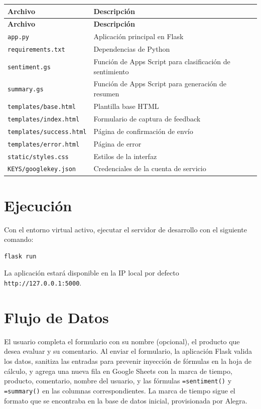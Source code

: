 \documentclass[12pt,a4paper]{article}
\begin{document}
\begin{longtable}{ll}
\textbf{Archivo} & \textbf{Descripción} \\
\midrule
\endfirsthead
\textbf{Archivo} & \textbf{Descripción} \\
\midrule
\endhead
\endlastfoot
\texttt{app.py} & Aplicación principal en Flask \\
\texttt{requirements.txt} & Dependencias de Python \\
\texttt{sentiment.gs} & Función de Apps Script para clasificación de sentimiento \\
\texttt{summary.gs} & Función de Apps Script para generación de resumen \\
\texttt{templates/base.html} & Plantilla base HTML \\
\texttt{templates/index.html} & Formulario de captura de feedback \\
\texttt{templates/success.html} & Página de confirmación de envío \\
\texttt{templates/error.html} & Página de error \\
\texttt{static/styles.css} & Estilos de la interfaz \\
\texttt{KEYS/googlekey.json} & Credenciales de la cuenta de servicio\\
\end{longtable}

\section{Ejecución}

Con el entorno virtual activo, ejecutar el servidor de desarrollo con el siguiente comando:

\begin{verbatim}
flask run
\end{verbatim}

La aplicación estará disponible en la IP local por defecto \texttt{http://127.0.0.1:5000}.

\section{Flujo de Datos}

El usuario completa el formulario con su nombre (opcional), el producto que desea evaluar y su comentario. Al enviar el formulario, la aplicación Flask valida los datos, sanitiza las entradas para prevenir inyección de fórmulas en la hoja de cálculo, y agrega una nueva fila en Google Sheets con la marca de tiempo, producto, comentario, nombre del usuario, y las fórmulas \texttt{=sentiment()} y \texttt{=summary()} en las columnas correspondientes. La marca de tiempo sigue el formato que se encontraba en la base de datos inicial, provisionada por Alegra.
\end{document}
